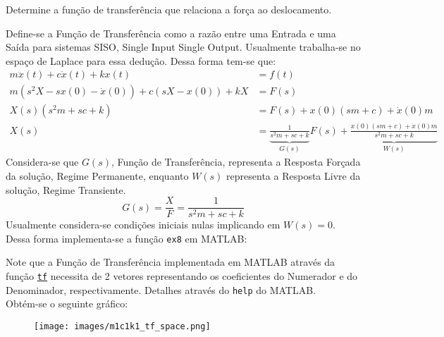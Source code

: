 \documentclass{article}
\begin{document}
\newpage
\begin{exercise}\label{ex8}
    Determine a função de transferência que relaciona a força ao deslocamento.
\end{exercise}
\begin{resolution}
    Define-se a Função de Transferência como a razão entre uma Entrada e uma Saída para sistemas SISO, Single Input Single Output. Usualmente trabalha-se no espaço de Laplace para essa dedução. Dessa forma tem-se que:
    \begin{align*}
        m\ddot{x}(t) + c\dot{x}(t) + k x(t) &= f(t)\\
        m(s^2 X - sx(0) - \dot{x}(0)) + c(s X - x(0)) + kX &= F(s)\\
        X(s)(s^2m + sc + k) &= F(s) + x(0)(sm + c) + \dot{x}(0)m\\
        X(s) &= 
        \underbrace{\frac{1}{s^2m + sc + k}}_{G(s)} F(s) + 
        \underbrace{\frac{x(0)(sm + c) + \dot{x}(0)m}{s^2m + sc + k}}_{W(s)}
    \end{align*}
    Considera-se que $G(s)$, Função de Transferência, representa a Resposta Forçada da solução, Regime Permanente, enquanto $W(s)$ representa a Resposta Livre da solução, Regime Transiente.
    \begin{equation}
        \boxed{G(s) = \frac{X}{F} = \frac{1}{s^2m + sc + k}}
    \end{equation}
    Usualmente considera-se condições iniciais nulas implicando em $W(s) = 0$. Dessa forma implementa-se a função \texttt{ex8} em MATLAB:
    \begin{scriptsize}
        \myMatlab
    \end{scriptsize}
    Note que a Função de Transferência implementada em MATLAB através da função \href{https://www.mathworks.com/help/control/ref/tf.html}{\texttt{tf}} necessita de 2 vetores representando os coeficientes do Numerador e do Denominador, respectivamente. Detalhes através do \texttt{help} do MATLAB.\\

    Obtém-se o seguinte gráfico:
    \begin{figure}[H]
        \centering
        \texttt{[image: images/m1c1k1\_tf\_space.png]}
    \end{figure}
\end{resolution}
\end{document}
